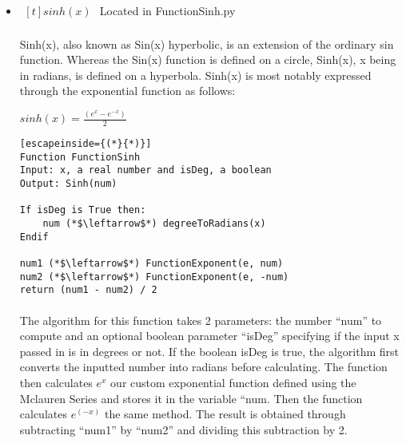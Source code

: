 \begin{itemize}
            \begin{lstlisting}[escapeinside={(*}{*)}]
Function FunctionStandardDeviation
Input: (*$\phi$*) : List of real numbers
Output: Standard Deviation of list

mean (*$\leftarrow$*) (*$\phi$*).getAverage()
(*$\sigma$*) (*$\leftarrow$*) 0
for every datapoint in (*$\phi$*) do
	(*$\sigma$*) (*$\leftarrow$*) (*$\sigma$*) + FunctionExponent((datapoint - mean), 2)
od

Return FunctionExponent((*$\sigma$*) / length((*$\phi$*)), 0.5)
            \end{lstlisting}

        \item $\begin{aligned}[t]
            sinh(x)
        \end{aligned}$
            Located in FunctionSinh.py

            \paragraph{}
            Sinh(x), also known as Sin(x) hyperbolic, is an extension of the ordinary sin function. Whereas the Sin(x) function is defined on a circle, Sinh(x), x being in radians, is defined on a hyperbola. Sinh(x) is most notably expressed through the exponential function as follows:

            \begin{center}
                $sinh(x) = \frac{(e^x-e^{-x})}{2}$
            \end{center}

            \begin{lstlisting}[escapeinside={(*}{*)}]
Function FunctionSinh
Input: x, a real number and isDeg, a boolean
Output: Sinh(num)

If isDeg is True then:
    num (*$\leftarrow$*) degreeToRadians(x)
Endif

num1 (*$\leftarrow$*) FunctionExponent(e, num)
num2 (*$\leftarrow$*) FunctionExponent(e, -num)
return (num1 - num2) / 2
            \end{lstlisting}

            \paragraph{}
            The algorithm for this function takes 2 parameters: the number “num” to compute and an optional boolean parameter “isDeg” specifying if the input x passed in is in degrees or not. If the boolean isDeg is true, the algorithm first converts the inputted number into radians before calculating. The function then calculates $e^x$ our custom exponential function defined using the Mclauren Series and stores it in the variable “num. Then the function calculates $e^(-x)$ the same method. The result is obtained through subtracting “num1” by “num2” and dividing this subtraction by 2.


\end{itemize}
